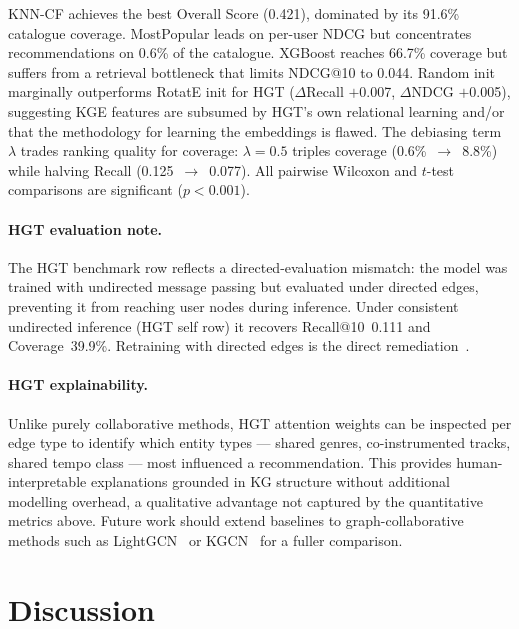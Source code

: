 \documentclass[10pt,twocolumn,letterpaper]{article}
\begin{document}
KNN-CF achieves the best Overall Score (0.421), dominated by its 91.6\% catalogue coverage. MostPopular leads on per-user NDCG but concentrates recommendations on 0.6\% of the catalogue. XGBoost reaches 66.7\% coverage but suffers from a retrieval bottleneck that limits NDCG@10 to 0.044. Random init marginally outperforms RotatE init for HGT ($\Delta$Recall $+$0.007, $\Delta$NDCG $+$0.005), suggesting KGE features are subsumed by HGT's own relational learning and/or that the methodology for learning the embeddings is flawed. The debiasing term $\lambda$ trades ranking quality for coverage: $\lambda{=}0.5$ triples coverage (0.6\%~$\to$~8.8\%) while halving Recall (0.125~$\to$~0.077). All pairwise Wilcoxon and $t$-test comparisons are significant ($p<0.001$).

\paragraph{HGT evaluation note.}
The HGT benchmark row reflects a directed-evaluation mismatch: the model was trained with undirected message passing but evaluated under directed edges, preventing it from reaching user nodes during inference. Under consistent undirected inference (HGT self row) it recovers Recall@10~0.111 and Coverage~39.9\%. Retraining with directed edges is the direct remediation~\cite{hu2020hgt}.

\paragraph{HGT explainability.}
Unlike purely collaborative methods, HGT attention weights can be inspected per edge type to identify which entity types — shared genres, co-instrumented tracks, shared tempo class — most influenced a recommendation. This provides human-interpretable explanations grounded in KG structure without additional modelling overhead, a qualitative advantage not captured by the quantitative metrics above. Future work should extend baselines to graph-collaborative methods such as LightGCN~\cite{he2020lightgcn} or KGCN~\cite{wang2019kgcn} for a fuller comparison.

\section{Discussion}
\label{sec:discussion}
\end{document}
